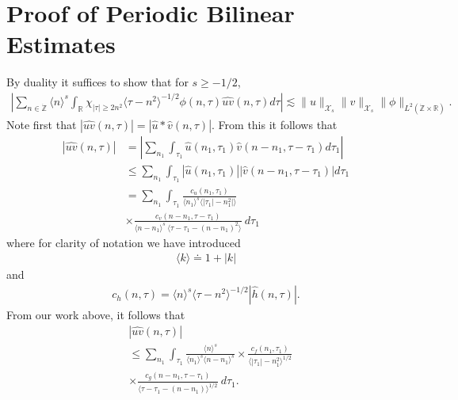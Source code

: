 \documentclass[12pt,reqno]{amsart}
\numberwithin{equation}{section}  %
\newcommand{\rr}{\mathbb{R}}
\newcommand{\zz}{\mathbb{Z}}
\newcommand{\zzdot}{\dot{\zz}}
\newcommand{\wh}{\widehat}
\begin{document}
\section{Proof of Periodic Bilinear Estimates} 
\label{sec:proof-bilin-est}
By duality it suffices to show that for $s \ge -1/2$, 
%
\begin{equation}
	\label{duality-est}
	\begin{split}
	|	\sum_{n \in \zzdot}  \langle n \rangle^{s}
	\int_{\rr} \chi_{| \tau | \ge 2n^{2}}\langle \tau - n^{2}  \rangle ^{-1/2}\phi(n, \tau) \wh{uv}(n, \tau) d \tau | \lesssim \|u\|_{\mathcal{X}_{s}}
    \|v\|_{\mathcal{X}_{s}}
    \|\phi \|_{L^{2}(\zzdot \times \rr)}.
	\end{split}
\end{equation}
Note first that $|\wh{uv}(n, \tau) |  = | \wh{u} *  \wh{v} 
(n, \tau)|$. From this it follows that
%
%
\begin{equation}
	\label{non-lin-rep}
	\begin{split}
		| \wh{uv}(n, \tau)|
    & = | \sum_{n_{1}}  \int_{\tau_{1}}
    \wh{u}\left( n_1,  \tau_1 \right) \wh{v}\left( n - n_1 , \tau - \tau_1   
\right) d \tau_1 |
\\
& \le  \sum_{n_{1}}  \int_{\tau_{1}}
    |\wh{u}\left( n_1,  \tau_1 \right)| |\wh{v}\left( n - n_1 , \tau - \tau_1   
\right)| d \tau_1 
\\
& = \sum_{n_{1}} \int_{\tau_{1}} \frac{c_u\left( n_1, \tau_1 
\right)}{\langle n_1 \rangle ^s \langle |\tau_1| - n_1^{2} | \rangle }
\\
& \times \frac{c_{v}\left( n - n_1, \tau - \tau_1 \right)}{\langle n -
n_1 \rangle ^s\ \langle \tau - \tau_{1} -  (n - n_1)^{2} \rangle}
  \ d \tau_1 
\end{split}
\end{equation}
%
%
where for clarity of notation we have introduced 
%
%
%
\begin{equation*}
\begin{split}
\langle k \rangle \doteq 1 + |k|
\end{split}
\end{equation*}
%
%
and
%
\begin{equation*}
	\begin{split}
		c_h(n, \tau) =
		\langle n \rangle ^s \langle \tau - n^{2} \rangle^{-1/2} | \wh{h}\left( n, \tau \right) |.
	\end{split}
\end{equation*}
%
%
From our work above, it follows that 
%
%
\begin{equation}
	\label{convo-est-starting-pnt}
	\begin{split}
		 &  | \wh{uv}\left( 
		n, \tau \right) |
		\\
		& \le  
		\sum_{n_{1}} \int_{\tau_{1}} \frac{\langle n \rangle^{s}}{\langle n_1 \rangle^s
    \langle n - n_1 \rangle^s} 
    \times \frac{c_f(n_1, \tau_1)}{\langle |\tau_1| - n_1^{2} \rangle^{1/2}}
		\\
		& \times
		\frac{c_g(n - n_1, \tau - \tau_1 )}{\langle \tau - \tau_{1} - (n - n_1)
		\rangle^{1/2}}\ d \tau_1.
	\end{split}
\end{equation}
\end{document}
